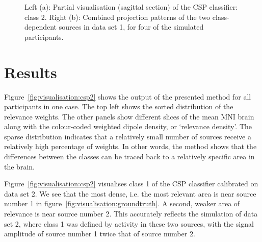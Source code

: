 \begin{figure}[t]
    \centering
    \qquad
    \caption{Left (a): Partial visualisation (sagittal section) of the CSP classifier: class 2. Right (b): Combined projection patterns of the two class-dependent sources in data set 1, for four of the simulated participants.}
    \label{fig:visualisation:csp1proj}
\end{figure}


\section{Results}

Figure~\ref{fig:visualisation:csp2} shows the output of the presented method for all participants in one case. The top left shows the sorted distribution of the relevance weights. The other panels show different slices of the mean MNI brain along with the colour-coded weighted dipole density, or `relevance density'. The sparse distribution indicates that a relatively small number of sources receive a relatively high percentage of weights. In other words, the method shows that the differences between the classes can be traced back to a relatively specific area in the brain.

Figure~\ref{fig:visualisation:csp2} visualises class 1 of the CSP classifier calibrated on data set 2. We see that the most dense, i.e. the most relevant area is near source number 1 in figure~\ref{fig:visualisation:groundtruth}. A second, weaker area of relevance is near source number 2. This accurately reflects the simulation of data set 2, where class 1 was defined by activity in these two sources, with the signal amplitude of source number 1 twice that of source number 2.

